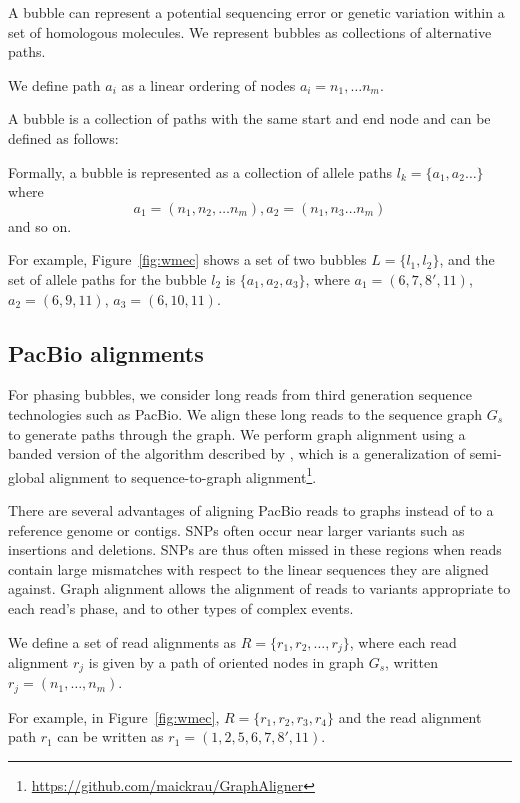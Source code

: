 A bubble can represent a potential sequencing error or genetic variation within a set of homologous molecules.
We represent bubbles as collections of alternative paths.

\begin{definition}[Path] We define path $a_i$ as a linear ordering of nodes $a_i= n_1, \ldots n_m$. 
\label{def:allele-path}
\end{definition}

A bubble is a collection of paths with the same start and end node and can be defined as follows:
\begin{definition}[Bubble]
Formally, a bubble is represented as a collection of allele paths
 $l_k= \{a_1,a_2 \ldots\}$
 where 
 \[a_1=(n_1, n_2, \ldots n_m), a_2=(n_1, n_3 \ldots n_m)\] and so on. 
\end{definition}


For example, Figure~\ref{fig:wmec} shows a set of two bubbles $L=\{l_1, l_2\}$, and the set of allele paths for the
bubble $l_2$ is $\{a_1, a_2, a_3\}$,
where $a_1 = (6, 7, 8', 11)$, $a_2 = (6, 9, 11)$, $a_3=  (6, 10, 11)$.

\subsection{PacBio alignments} 
For phasing bubbles, we consider long reads from third generation sequence technologies such as PacBio.
We align these long reads to the sequence graph $G_s$ to generate paths through the graph.
We perform graph alignment using a banded version of the algorithm described by \cite{rautiainen2017aligning}, which is a generalization of semi-global alignment to sequence-to-graph alignment\footnote{\url{https://github.com/maickrau/GraphAligner}}.

There are several advantages of aligning PacBio reads to graphs instead of to a reference genome or contigs.
SNPs often occur near larger variants such as insertions and deletions. SNPs are thus often missed in these regions when reads contain large mismatches with respect to the linear sequences they are aligned against. Graph alignment allows the alignment of reads to variants appropriate to each read's phase, and to other types of complex events.

\begin{definition}[Alignment]
We define a set of read alignments as $R=\{r_1, r_2, \ldots, r_j\}$, where each read alignment $r_{j}$ is given by a path of oriented nodes in graph $G_s$, written $r_{j}=(n_1, \ldots, n_m)$.
\end{definition}
For example, in Figure~\ref{fig:wmec}, $R = \{r_1, r_2, r_3, r_4\}$ and the read alignment path $r_1$ can be written as 
$r_1 = (1, 2, 5, 6, 7, 8', 11 )$.


